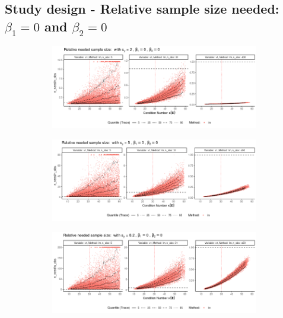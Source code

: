 \documentclass[11pt,a4paper,twoside]{book}\usepackage[]{graphicx}\usepackage[]{xcolor}
\begin{document}
\newpage
\vspace*{-1cm}
\subsection{Study design - Relative sample size needed: $\beta_1=0$ and $\beta_2=0$}
\begin{figure}[H]
\centering
\begin{subfigure}[b]{1\textwidth}
\vspace*{-0.5cm}
\includegraphics[width=1\textwidth]{../fromsim/simres_nrel10-1.png}
\end{subfigure}
\begin{subfigure}[b]{1\textwidth}
\vspace*{-1cm}
\includegraphics[width=1\textwidth]{../fromsim/simres_nrel11-1.png}
\end{subfigure}
\begin{subfigure}[b]{1\textwidth}
\vspace*{-1cm}
\includegraphics[width=1\textwidth]{../fromsim/simres_nrel12-1.png}

\end{subfigure}
\end{figure}
\end{document}
